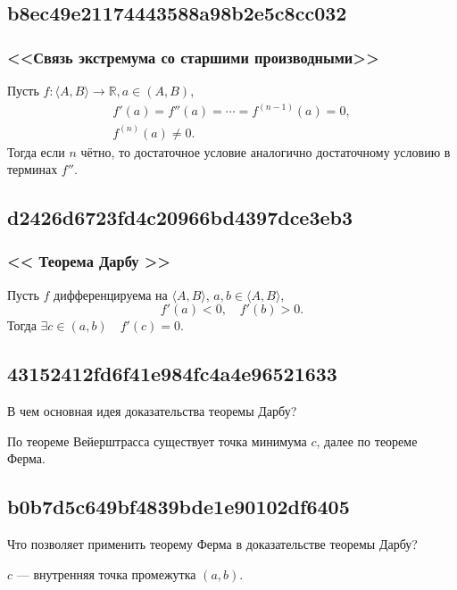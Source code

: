 \documentclass[11pt, a5paper]{article}
\newenvironment{note}[1]{\goodbreak\par\subsection{\hfill \color{lightgray}\tiny #1}}{}
\newenvironment{cloze}[2][\ldots]{\begin{leftbar}}{\end{leftbar}}
\newenvironment{icloze}[2][\ldots]{%
  \ignorespaces\text{\tiny \color{lightgray}\{#2} %
}{%
  \text{\tiny\color{lightgray}\}}\unskip%
}
\begin{document}
\begin{note}{b8ec49e21174443588a98b2e5c8cc032}
    \subsubsection{<<Связь экстремума со старшими производными>>}

    Пусть \( f : \langle A, B \rangle \to \mathbb R, a \in (A, B) \),
    \[
        \begin{gathered}
            f'(a) = f''(a) = \cdots = f^{(n - 1)}(a) = 0, \\
            f^{(n)}(a) \neq 0.
        \end{gathered}
    \]
    Тогда если \begin{icloze}{2}\( n \) чётно,\end{icloze} \begin{icloze}{1}то достаточное условие аналогично достаточному условию в терминах \( f'' \).\end{icloze}
\end{note}

\begin{note}{d2426d6723fd4c20966bd4397dce3eb3}
    \subsubsection{<<\begin{icloze}{3}Теорема Дарбу\end{icloze}>>}

    Пусть \begin{icloze}{2}\( f \) дифференцируема на \( \langle A, B \rangle  \), \( a, b \in \langle A, B \rangle \),
    \[
        f'(a) < 0, \quad f'(b) > 0.
    \]\end{icloze}
    Тогда \begin{icloze}{1}\( \exists c \in (a, b) \quad f'(c) = 0 \).\end{icloze}
\end{note}

\begin{note}{43152412fd6f41e984fc4a4e96521633}
    В чем основная идея доказательства теоремы Дарбу?

    \begin{cloze}{1}
        По теореме Вейерштрасса существует точка минимума \( c \), далее по теореме Ферма.
    \end{cloze}
\end{note}

\begin{note}{b0b7d5c649bf4839bde1e90102df6405}
    Что позволяет применить теорему Ферма в доказательстве теоремы Дарбу?

    \begin{cloze}{1}
        \( c \) --- внутренняя точка промежутка \( (a, b) \).
    \end{cloze}
\end{note}
\end{document}
